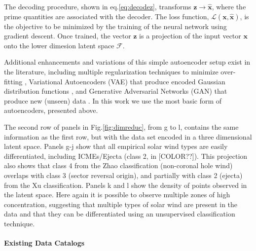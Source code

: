 The decoding procedure, shown in eq.\eqref{eq:decodez}, transforms $\boldsymbol{z}\rightarrow\boldsymbol{\hat{x}}$, where the prime quantities are associated with the decoder. The loss function, $\mathcal{L}(\boldsymbol{x}, \boldsymbol{\hat{x}})$, is the objective to be minimized by the training of the neural network using gradient descent. Once trained, the vector $\boldsymbol{z}$ is a projection of the input vector $\boldsymbol{x}$ onto the lower dimesion latent space $\boldsymbol{\mathcal{F}}$.

Additional enhancements and variations of this simple autoencoder setup exist in the literature, including multiple regularization techniques to minimize over-fitting \citep{[REF??]}, Variational Autoencoders (VAE) that produce encoded Gaussian distribution functions \citep{[REF??]}, and Generative Adversarial Networks (GAN) that produce new (unseen) data \citep{[REF??]}. In this work we use the most basic form of autoencoders, presented above.

The second row of panels in Fig.\ref{fig:dimreduc}, from g to l, contains the same information as the first row, but with the data set encoded in a three dimensional latent space. Panels g-j show that all empirical solar wind types are easily differentiated, including ICMEs/Ejecta (class 2, in [COLOR??]). This projection also shows that class 4 from the Zhao classification (non-coronal hole wind) overlaps with class 3 (sector reversal origin), and partially with class 2 (ejecta) from the Xu classification. Panels k and l show the density of points observed in the latent space. Here again it is possible to observe multiple zones of high concentration, suggesting that multiple types of solar wind are present in the data and that they can be differentiated using an unsupervised classification technique.

\paragraph{Existing Data Catalogs}